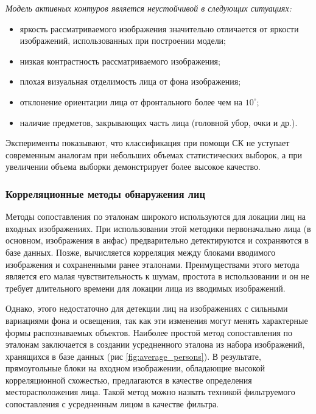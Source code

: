 \textit{Модель активных контуров является неустойчивой в следующих ситуациях:}
\begin{itemize}
    \item яркость рассматриваемого изображения значительно 
        отличается от яркости изображений, использованных 
        при построении модели; 
    \item низкая контрастность рассматриваемого изображения;
    \item плохая визуальная отделимость лица от фона изображения;
    \item отклонение ориентации лица от фронтального более чем на $10^{\circ}$;
    \item наличие предметов, закрывающих часть лица (головной убор, очки и др.).
\end{itemize}

Эксперименты показывают, что классификация 
при помощи СК не уступает современным аналогам при небольших объемах статистических выборок, а при увеличении 
объема выборки демонстрирует более высокое качество.

\subsubsection{Корреляционные методы обнаружения лиц}

Методы сопоставления по эталонам широкого используются для локации лиц на входных изображениях. При использовании этой методики
первоначально лица (в основном, изображения в анфас) предварительно детектируются и сохраняются в базе данных. Позже, вычисляется
корреляция между блоками вводимого изображения и сохраненными ранее эталонами. Преимуществами этого метода является его малая
чувствительность к шумам, простота в использовании и он не требует длительного времени для локации лица из вводимых изображений.

Однако, этого недостаточно для детекции лиц на изображениях с сильными вариациями фона и освещения, так как эти изменения могут
менять характерные формы распознаваемых объектов. Наиболее простой метод сопоставления по эталонам заключается в создании
усредненного эталона из набора изображений, хранящихся в базе данных (рис \ref{fig:average_persons}). В результате, прямоугольные блоки на входном изображении,
обладающие высокой корреляционной схожестью, предлагаются в качестве определения месторасположения лица. Такой метод можно назвать
техникой фильтруемого сопоставления с усредненным лицом в качестве фильтра\cite{correlations}.

